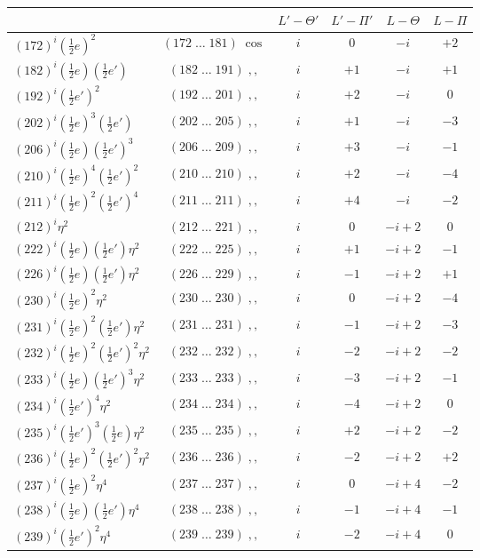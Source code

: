 \documentclass[11pt]{article}
\begin{document}
\begin{center}
\begin{tabular}{|l|c|c|c|c|c|}
\hline
 & & $L'-\Theta'$ & $L'-\Pi'$ & $L-\Theta$ & $L-\Pi$ \\
\hline
$(172)^i(\tfrac{1}{2}e)^2$ & $(172\;\ldots\;181)\;\cos$ & $i$ & $0$ & $-i$ & $+2$ \\
$(182)^i(\tfrac{1}{2}e)(\tfrac{1}{2}e')$ & $(182\;\ldots\;191)\;,,$ & $i$ & $+1$ & $-i$ & $+1$ \\
$(192)^i(\tfrac{1}{2}e')^2$ & $(192\;\ldots\;201)\;,,$ & $i$ & $+2$ & $-i$ & $0$ \\
$(202)^i(\tfrac{1}{2}e)^3(\tfrac{1}{2}e')$ & $(202\;\ldots\;205)\;,,$ & $i$ & $+1$ & $-i$ & $-3$ \\
$(206)^i(\tfrac{1}{2}e)(\tfrac{1}{2}e')^3$ & $(206\;\ldots\;209)\;,,$ & $i$ & $+3$ & $-i$ & $-1$ \\
$(210)^i(\tfrac{1}{2}e)^4(\tfrac{1}{2}e')^2$ & $(210\;\ldots\;210)\;,,$ & $i$ & $+2$ & $-i$ & $-4$ \\
$(211)^i(\tfrac{1}{2}e)^2(\tfrac{1}{2}e')^4$ & $(211\;\ldots\;211)\;,,$ & $i$ & $+4$ & $-i$ & $-2$ \\
$(212)^i\eta^2$ & $(212\;\ldots\;221)\;,,$ & $i$ & $0$ & $-i+2$ & $0$ \\
$(222)^i(\tfrac{1}{2}e)(\tfrac{1}{2}e')\eta^2$ & $(222\;\ldots\;225)\;,,$ & $i$ & $+1$ & $-i+2$ & $-1$ \\
$(226)^i(\tfrac{1}{2}e)(\tfrac{1}{2}e')\eta^2$ & $(226\;\ldots\;229)\;,,$ & $i$ & $-1$ & $-i+2$ & $+1$ \\
$(230)^i(\tfrac{1}{2}e)^2\eta^2$ & $(230\;\ldots\;230)\;,,$ & $i$ & $0$ & $-i+2$ & $-4$ \\
$(231)^i(\tfrac{1}{2}e)^2(\tfrac{1}{2}e')\eta^2$ & $(231\;\ldots\;231)\;,,$ & $i$ & $-1$ & $-i+2$ & $-3$ \\
$(232)^i(\tfrac{1}{2}e)^2(\tfrac{1}{2}e')^2\eta^2$ & $(232\;\ldots\;232)\;,,$ & $i$ & $-2$ & $-i+2$ & $-2$ \\
$(233)^i(\tfrac{1}{2}e)(\tfrac{1}{2}e')^3\eta^2$ & $(233\;\ldots\;233)\;,,$ & $i$ & $-3$ & $-i+2$ & $-1$ \\
$(234)^i(\tfrac{1}{2}e')^4\eta^2$ & $(234\;\ldots\;234)\;,,$ & $i$ & $-4$ & $-i+2$ & $0$ \\
$(235)^i(\tfrac{1}{2}e')^3(\tfrac{1}{2}e)\eta^2$ & $(235\;\ldots\;235)\;,,$ & $i$ & $+2$ & $-i+2$ & $-2$ \\
$(236)^i(\tfrac{1}{2}e)^2(\tfrac{1}{2}e')^2\eta^2$ & $(236\;\ldots\;236)\;,,$ & $i$ & $-2$ & $-i+2$ & $+2$ \\
$(237)^i(\tfrac{1}{2}e)^2\eta^4$ & $(237\;\ldots\;237)\;,,$ & $i$ & $0$ & $-i+4$ & $-2$ \\
$(238)^i(\tfrac{1}{2}e)(\tfrac{1}{2}e')\eta^4$ & $(238\;\ldots\;238)\;,,$ & $i$ & $-1$ & $-i+4$ & $-1$ \\
$(239)^i(\tfrac{1}{2}e')^2\eta^4$ & $(239\;\ldots\;239)\;,,$ & $i$ & $-2$ & $-i+4$ & $0$ \\
\hline
\end{tabular}
\end{center}
\end{document}
